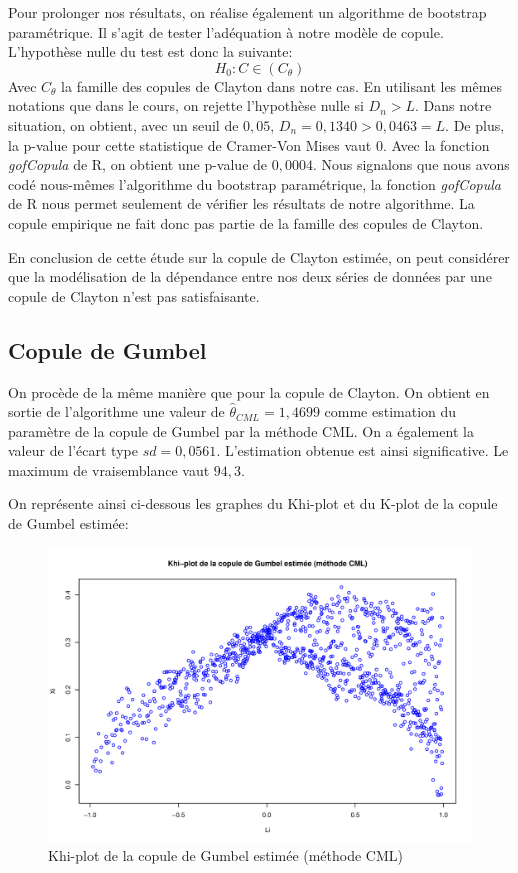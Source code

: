Pour prolonger nos résultats, on réalise également un algorithme de bootstrap paramétrique. Il s'agit de tester l'adéquation à notre modèle de copule. L'hypothèse nulle du test est donc la suivante:
$$
H_0 : C \in (C_{\theta})
$$
Avec $C_{\theta}$ la famille des copules de Clayton dans notre cas. 
En utilisant les mêmes notations que dans le cours, on rejette l'hypothèse nulle si $D_n > L$. 
Dans notre situation, on obtient, avec un seuil de $0,05$, $D_n = 0,1340 > 0,0463 = L$. De plus, la p-value pour cette statistique de Cramer-Von Mises vaut $0$. Avec la fonction \textit{gofCopula} de R, on obtient une p-value de $0,0004$. 
Nous signalons que nous avons codé nous-mêmes l'algorithme du bootstrap paramétrique, la fonction \textit{gofCopula} de R nous permet seulement de vérifier les résultats de notre algorithme.
La copule empirique ne fait donc pas partie de la famille des copules de Clayton.

En conclusion de cette étude sur la copule de Clayton estimée, on peut considérer que la modélisation de la dépendance entre nos deux séries de données par une copule de Clayton n'est pas satisfaisante.

\subsection{Copule de Gumbel}

On procède de la même manière que pour la copule de Clayton. On obtient en sortie de l'algorithme une valeur de $\widehat{\theta}_{CML}=1,4699$ comme estimation du paramètre de la copule de Gumbel par la méthode CML. On a également la valeur de l'écart type $sd = 0,0561$. L'estimation obtenue est ainsi significative. Le maximum de vraisemblance vaut $94,3$.

On représente ainsi ci-dessous les graphes du Khi-plot et du K-plot de la copule de Gumbel estimée:

\noindent%
\begin{figure}[H]
    \begin{center}
      \includegraphics[width=17 cm, angle=0]{./pictures/gumbelcmlkhiplot.png}
      \centering\caption{\label{2}Khi-plot de la copule de Gumbel estimée (méthode CML)}
    \end{center}
\end{figure}

